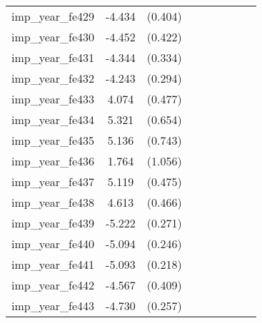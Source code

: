 {\begin{tabular}{l*{4}{cc}}
imp\_year\_fe429&   -4.434\sym{***}&  (0.404)&                  &         &                  &         &                  &         \\
imp\_year\_fe430&   -4.452\sym{***}&  (0.422)&                  &         &                  &         &                  &         \\
imp\_year\_fe431&   -4.344\sym{***}&  (0.334)&                  &         &                  &         &                  &         \\
imp\_year\_fe432&   -4.243\sym{***}&  (0.294)&                  &         &                  &         &                  &         \\
imp\_year\_fe433&    4.074\sym{***}&  (0.477)&                  &         &                  &         &                  &         \\
imp\_year\_fe434&    5.321\sym{***}&  (0.654)&                  &         &                  &         &                  &         \\
imp\_year\_fe435&    5.136\sym{***}&  (0.743)&                  &         &                  &         &                  &         \\
imp\_year\_fe436&    1.764         &  (1.056)&                  &         &                  &         &                  &         \\
imp\_year\_fe437&    5.119\sym{***}&  (0.475)&                  &         &                  &         &                  &         \\
imp\_year\_fe438&    4.613\sym{***}&  (0.466)&                  &         &                  &         &                  &         \\
imp\_year\_fe439&   -5.222\sym{***}&  (0.271)&                  &         &                  &         &                  &         \\
imp\_year\_fe440&   -5.094\sym{***}&  (0.246)&                  &         &                  &         &                  &         \\
imp\_year\_fe441&   -5.093\sym{***}&  (0.218)&                  &         &                  &         &                  &         \\
imp\_year\_fe442&   -4.567\sym{***}&  (0.409)&                  &         &                  &         &                  &         \\
imp\_year\_fe443&   -4.730\sym{***}&  (0.257)&                  &         &                  &         &                  &         \\

\end{tabular}}
